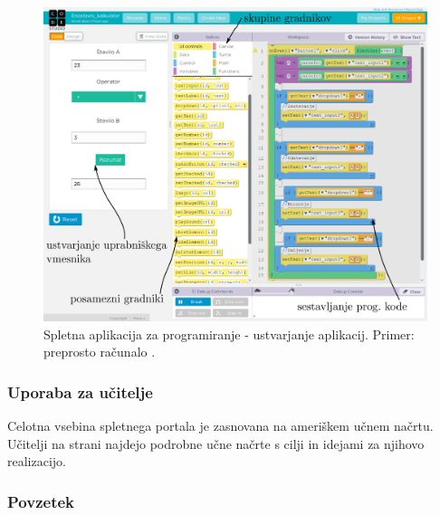 \begin{figure}[h!]
  \centering
    \includegraphics [width=0.90\linewidth, keepaspectratio =
    1] {./images/sc_web/code_cs_mobile.jpg}
    \caption{Spletna aplikacija za programiranje - ustvarjanje
      aplikacij. Primer: preprosto računalo \cite{web:code.org:studio}.}
    \label{fig:scr:web:code:mp:app}
  \end{figure}

\subsubsection{Uporaba za učitelje}
\label{sec:uporaba-za-uitelje}

Celotna vsebina spletnega portala je zasnovana na ameriškem učnem
načrtu. Učitelji na strani najdejo podrobne učne načrte s cilji in
idejami za njihovo realizacijo. 

\subsubsection{Povzetek}
\label{sec:povzetek-code}

